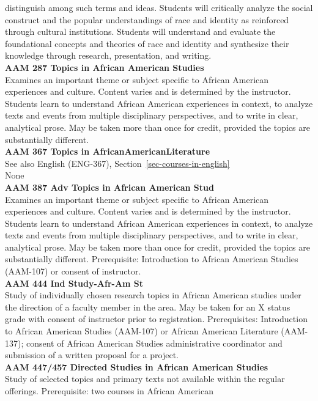 \documentclass[
  letterpaper,
]{scrbook}
\begin{document}
distinguish among such terms and ideas. Students will critically analyze
the social construct and the popular understandings of race and identity
as reinforced through cultural institutions. Students will understand
and evaluate the foundational concepts and theories of race and identity
and synthesize their knowledge through research, presentation, and
writing.\\
\textbf{AAM 287 Topics in African American Studies}\\
Examines an important theme or subject specific to African American
experiences and culture. Content varies and is determined by the
instructor. Students learn to understand African American experiences in
context, to analyze texts and events from multiple disciplinary
perspectives, and to write in clear, analytical prose. May be taken more
than once for credit, provided the topics are substantially different.\\
\textbf{AAM 367 Topics in AfricanAmericanLiterature}\\
See also English (ENG-367), Section~\ref{sec-courses-in-english}\\
None\\
\textbf{AAM 387 Adv Topics in African American Stud}\\
Examines an important theme or subject specific to African American
experiences and culture. Content varies and is determined by the
instructor. Students learn to understand African American experiences in
context, to analyze texts and events from multiple disciplinary
perspectives, and to write in clear, analytical prose. May be taken more
than once for credit, provided the topics are substantially different.
Prerequisite: Introduction to African American Studies (AAM-107) or
consent of instructor.\\
\textbf{AAM 444 Ind Study-Afr-Am St}\\
Study of individually chosen research topics in African American studies
under the direction of a faculty member in the area. May be taken for an
X status grade with consent of instructor prior to registration.
Prerequisites: Introduction to African American Studies (AAM-107) or
African American Literature (AAM-137); consent of African American
Studies administrative coordinator and submission of a written proposal
for a project.\\
\textbf{AAM 447/457 Directed Studies in African American Studies}\\
Study of selected topics and primary texts not available within the
regular offerings. Prerequisite: two courses in African American
\end{document}
